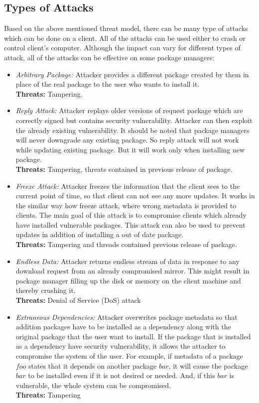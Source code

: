 \documentclass{IEEEtran}
\begin{document}
\subsection{Types of Attacks}
\label{subsec:attack-types}
Based on the above mentioned threat model, there can be many type of attacks which can be done on a client. All of the attacks can be used either to crash or control client's computer. Although the impact can vary for different types of attack, all of the attacks can be effective on some package managers:
\begin{itemize}
	\item \emph{Arbitrary Package:} Attacker provides a different package created by them in place of the real package to the user who wants to install it. \\
	\textbf{Threats:} Tampering.
	
	\item \emph{Reply Attack:} Attacker replays older versions of request package which are correctly signed but contains security vulnerability. Attacker can then exploit the already existing vulnerability. It should be noted that package managers will never downgrade any existing package. So reply attack will not work while updating existing package. But it will work only when installing new package. \\
	\textbf{Threats:} Tampering, threats contained in previous release of package.
	
	\item \emph{Freeze Attack:} Attacker freezes the information that the client sees to the current point of time, so that client can not see any more updates. It works in the similar way how freeze attack, where wrong metadata is provided to clients. The main goal of this attack is to compromise clients which already have installed vulnerable packages. This attack can also be used to prevent updates in addition of installing a out of date package. \\
	\textbf{Threats:} Tampering and threads contained previous release of package.
	
	\item \emph{Endless Data:} Attacker returns endless stream of data in response to any download request from an already compromised mirror. This might result in package manager filling up the disk or memory on the client machine and thereby crushing it. \\
	\textbf{Threats:} Denial of Service (DoS) attack
	
	\item \emph{Extraneous Dependencies:} Attacker overwrites package metadata so that addition packages have to be installed as a dependency along with the original package that the user want to install. If the package that is installed as a dependency have security vulnerability, it allows the attacker to compromise the system of the user. For example, if metadata of a package $foo$ states that it depends on another package $bar$, it will cause the package $bar$ to be installed even if it is not desired or needed. And, if this $bar$ is vulnerable, the whole system can be compromised. \\
	\textbf{Threats:} Tampering
\end{itemize}
\end{document}
